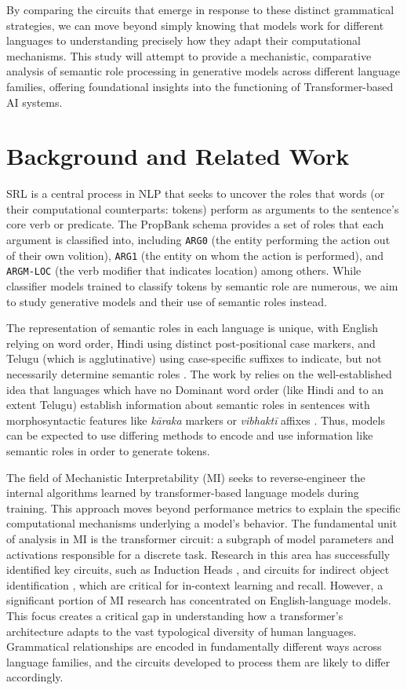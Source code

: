 \documentclass[11pt]{article}
\begin{document}
By comparing the circuits that emerge in response to these distinct grammatical strategies, we can move beyond simply knowing that models work for different languages to understanding precisely how they adapt their computational mechanisms. This study will attempt to provide a mechanistic, comparative analysis of semantic role processing in generative models across different language families, offering foundational insights into the functioning of Transformer-based AI systems.
\section*{Background and Related Work}
\label{sec:org9ed0ff3}

SRL is a central process in NLP that seeks to uncover the roles that words (or their computational counterparts: tokens) perform as arguments to the sentence's core verb or predicate. The PropBank \citep{10.1162/0891201053630264} schema provides a set of roles that each argument is classified into, including \texttt{ARG0} (the entity performing the action out of their own volition), \texttt{ARG1} (the entity on whom the action is performed), and \texttt{ARGM-LOC} (the verb modifier that indicates location) among others. While classifier models trained to classify tokens by semantic role are numerous, we aim to study generative models and their use of semantic roles instead.

The representation of semantic roles in each language is unique, with English relying on word order, Hindi using distinct post-positional case markers, and Telugu (which is agglutinative) using case-specific suffixes to indicate, but not necessarily determine semantic roles \citep{vaidya-etal-2011-analysis}.
The work by \citet{ghosh.etal2024} relies on the well-established idea that languages which have no Dominant word order (like Hindi and to an extent Telugu) establish information about semantic roles in sentences with morphosyntactic features like \emph{kāraka} markers or \emph{vibhaktī} affixes \citep{vaidya-etal-2011-analysis}. Thus, models can be expected to use differing methods to encode and use information like semantic roles in order to generate tokens.

The field of Mechanistic Interpretability (MI) seeks to reverse-engineer the internal algorithms learned by transformer-based language models during training. This approach moves beyond performance metrics to explain the specific computational mechanisms underlying a model's behavior. The fundamental unit of analysis in MI is the transformer circuit: \citep{elhage2021mathematical} a subgraph of model parameters and activations responsible for a discrete task. Research in this area has successfully identified key circuits, such as Induction Heads \citep{olsson.etal2022}, and circuits for indirect object identification \citep{wang.etal2022}, which are critical for in-context learning and recall. However, a significant portion of MI research has concentrated on English-language models. This focus creates a critical gap in understanding how a transformer's architecture adapts to the vast typological diversity of human languages. Grammatical relationships are encoded in fundamentally different ways across language families, and the circuits developed to process them are likely to differ accordingly.
\end{document}

